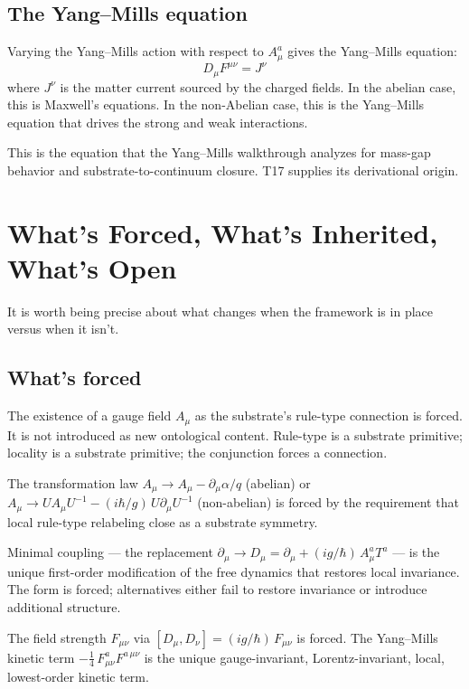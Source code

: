 \documentclass[11pt,a4paper]{article}
\begin{document}
\subsection{The Yang--Mills equation}

Varying the Yang--Mills action with respect to $A_\mu^a$ gives the Yang--Mills equation:
\[
D_\mu F^{\mu\nu} = J^\nu
\]
where $J^\nu$ is the matter current sourced by the charged fields. In the abelian case, this is Maxwell's equations. In the non-Abelian case, this is the Yang--Mills equation that drives the strong and weak interactions.

This is the equation that the Yang--Mills walkthrough analyzes for mass-gap behavior and substrate-to-continuum closure. T17 supplies its derivational origin.

\section{What's Forced, What's Inherited, What's Open}

It is worth being precise about what changes when the framework is in place versus when it isn't.

\subsection{What's forced}

The existence of a gauge field $A_\mu$ as the substrate's rule-type connection is forced. It is not introduced as new ontological content. Rule-type is a substrate primitive; locality is a substrate primitive; the conjunction forces a connection.

The transformation law $A_\mu \to A_\mu - \partial_\mu \alpha/q$ (abelian) or $A_\mu \to U A_\mu U^{-1} - (i\hbar/g)\, U \partial_\mu U^{-1}$ (non-abelian) is forced by the requirement that local rule-type relabeling close as a substrate symmetry.

Minimal coupling --- the replacement $\partial_\mu \to D_\mu = \partial_\mu + (ig/\hbar)\, A_\mu^a T^a$ --- is the unique first-order modification of the free dynamics that restores local invariance. The form is forced; alternatives either fail to restore invariance or introduce additional structure.

The field strength $F_{\mu\nu}$ via $[D_\mu, D_\nu] = (ig/\hbar)\, F_{\mu\nu}$ is forced. The Yang--Mills kinetic term $-\tfrac{1}{4}\, F_{\mu\nu}^a F^{a\,\mu\nu}$ is the unique gauge-invariant, Lorentz-invariant, local, lowest-order kinetic term.
\end{document}
